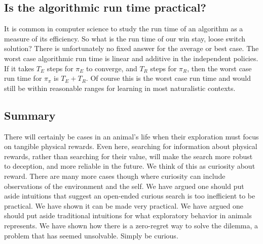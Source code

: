 \subsection{Is the algorithmic run time practical?}
It is common in computer science to study the run time of an algorithm as a measure of its efficiency. So what is the run time of our win stay, loose switch solution? There is unfortunately no fixed answer for the average or best case. The worst case algorithmic run time is linear and additive in the independent policies. If it takes $T_E$ steps for $\pi_E$ to converge, and $T_R$ steps for $\pi_R$, then the worst case run time for $\pi_{\pi}$ is $T_E + T_R$. Of course this is the worst case run time and would still be within reasonable ranges for learning in most naturalistic contexts.


\subsection*{Summary}
There will certainly be cases in an animal's life when their exploration must focus on tangible physical rewards. Even here, searching for information about physical rewards, rather than searching for their value, will make the search more robust to deception, and more reliable in the future. We think of this as curiosity about reward. There are many more cases though where curiosity can include observations of the environment and the self. We have argued one should put aside intuitions that suggest an open-ended curious search is too inefficient to be practical. We have shown it can be made very practical. We have argued one should put aside traditional intuitions for what exploratory behavior in animals represents. We have shown how there is a zero-regret way to solve the dilemma, a problem that has seemed unsolvable. Simply be curious.



